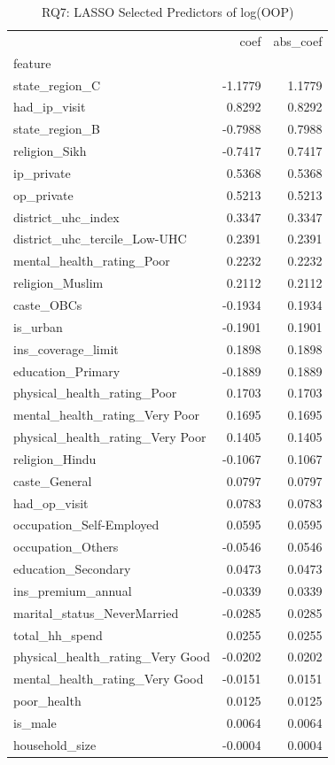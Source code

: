\begin{table}
\caption{RQ7: LASSO Selected Predictors of log(OOP)}
\label{tab:rq7_lasso}
\begin{tabular}{lrr}
\toprule
 & coef & abs_coef \\
feature &  &  \\
\midrule
state_region_C & -1.1779 & 1.1779 \\
had_ip_visit & 0.8292 & 0.8292 \\
state_region_B & -0.7988 & 0.7988 \\
religion_Sikh & -0.7417 & 0.7417 \\
ip_private & 0.5368 & 0.5368 \\
op_private & 0.5213 & 0.5213 \\
district_uhc_index & 0.3347 & 0.3347 \\
district_uhc_tercile_Low-UHC & 0.2391 & 0.2391 \\
mental_health_rating_Poor & 0.2232 & 0.2232 \\
religion_Muslim & 0.2112 & 0.2112 \\
caste_OBCs & -0.1934 & 0.1934 \\
is_urban & -0.1901 & 0.1901 \\
ins_coverage_limit & 0.1898 & 0.1898 \\
education_Primary & -0.1889 & 0.1889 \\
physical_health_rating_Poor & 0.1703 & 0.1703 \\
mental_health_rating_Very Poor & 0.1695 & 0.1695 \\
physical_health_rating_Very Poor & 0.1405 & 0.1405 \\
religion_Hindu & -0.1067 & 0.1067 \\
caste_General & 0.0797 & 0.0797 \\
had_op_visit & 0.0783 & 0.0783 \\
occupation_Self-Employed & 0.0595 & 0.0595 \\
occupation_Others & -0.0546 & 0.0546 \\
education_Secondary & 0.0473 & 0.0473 \\
ins_premium_annual & -0.0339 & 0.0339 \\
marital_status_NeverMarried & -0.0285 & 0.0285 \\
total_hh_spend & 0.0255 & 0.0255 \\
physical_health_rating_Very Good & -0.0202 & 0.0202 \\
mental_health_rating_Very Good & -0.0151 & 0.0151 \\
poor_health & 0.0125 & 0.0125 \\
is_male & 0.0064 & 0.0064 \\
household_size & -0.0004 & 0.0004 \\
\bottomrule
\end{tabular}
\end{table}
